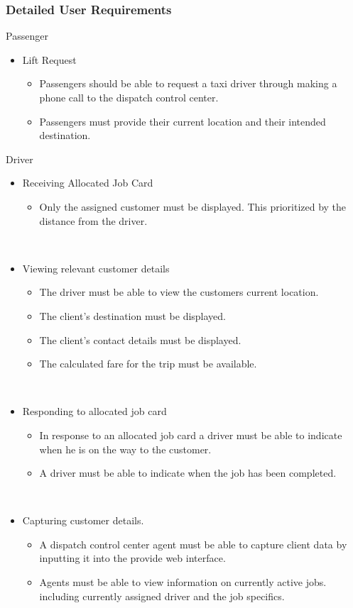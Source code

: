 \documentclass[10pt,twocolumn]{witseiepaper}
\begin{document}
\subsubsection{Detailed User Requirements}
Passenger 
\begin{itemize}
\item Lift Request
\begin{itemize}
\item Passengers should be able to request a taxi driver through making a phone call to the dispatch control center.
\item Passengers must provide their current location and their intended destination.
\end{itemize}
\end{itemize}

Driver
\begin{itemize} 
\item Receiving Allocated Job Card
\begin{itemize}
\item Only the assigned customer must be displayed. This prioritized by the distance from the driver.
\end{itemize}\

\item Viewing relevant customer details
\begin{itemize}
\item The driver must be able to view the customers current location.
\item The client's destination must be displayed.
\item The client's contact details must be displayed.
\item The calculated fare for the trip must be available.
\end{itemize}\

\item  Responding to allocated job card
\begin{itemize}
\item In response to an allocated job card a driver must be able to indicate when he is on the way to the customer.
\item A driver must be able to indicate when the job has been completed.
\end{itemize}\

\item Capturing customer details.
\begin{itemize}
\item A dispatch control center agent must be able to capture client data by inputting it into the provide web interface.
\item Agents must be able to view information on currently active jobs. including currently assigned driver and the job specifics.
\end{itemize}
\end{itemize}
\end{document}
